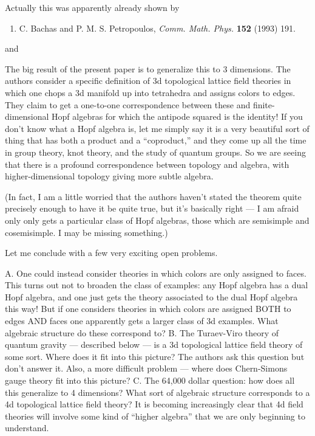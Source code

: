 \documentclass{article}
\def\tightlist{}
\renewcommand{\texttt}[1]{%
  \begingroup
  \ttfamily
  \begingroup\lccode`~=`/\lowercase{\endgroup\def~}{/\discretionary{}{}{}}%
  \begingroup\lccode`~=`[\lowercase{\endgroup\def~}{[\discretionary{}{}{}}%
  \begingroup\lccode`~=`.\lowercase{\endgroup\def~}{.\discretionary{}{}{}}%
  \catcode`/=\active\catcode`[=\active\catcode`.=\active
  \scantokens{#1\noexpand}%
  \endgroup
}
\begin{document}
Actually this was apparently already shown by

\begin{enumerate}
\def\labelenumi{\arabic{enumi})}
\setcounter{enumi}{1}
\tightlist
\item
  C. Bachas and P. M. S. Petropoulos, \emph{Comm. Math. Phys.}
  \textbf{152} (1993) 191.
\end{enumerate}

and


The big result of the present paper is to generalize this to 3
dimensions. The authors consider a specific definition of 3d topological
lattice field theories in which one chops a 3d manifold up into
tetrahedra and assigns colors to edges. They claim to get a one-to-one
correspondence between these and finite-dimensional Hopf algebras for
which the antipode squared is the identity! If you don't know what a
Hopf algebra is, let me simply say it is a very beautiful sort of thing
that has both a product and a ``coproduct,'' and they come up all the
time in group theory, knot theory, and the study of quantum groups. So
we are seeing that there is a profound correspondence between topology
and algebra, with higher-dimensional topology giving more subtle
algebra.

(In fact, I am a little worried that the authors haven't stated the
theorem quite precisely enough to have it be quite true, but it's
basically right --- I am afraid only only gets a particular class of
Hopf algebras, those which are semisimple and cosemisimple. I may be
missing something.)

Let me conclude with a few very exciting open problems.

A. One could instead consider theories in which colors are only assigned
to faces. This turns out not to broaden the class of examples: any Hopf
algebra has a dual Hopf algebra, and one just gets the theory associated
to the dual Hopf algebra this way! But if one considers theories in
which colors are assigned BOTH to edges AND faces one apparently gets a
larger class of 3d examples. What algebraic structure do these
correspond to? B. The Turaev-Viro theory of quantum gravity ---
described below --- is a 3d topological lattice field theory of some
sort. Where does it fit into this picture? The authors ask this question
but don't answer it. Also, a more difficult problem --- where does
Chern-Simons gauge theory fit into this picture? C. The 64,000 dollar
question: how does all this generalize to 4 dimensions? What sort of
algebraic structure corresponds to a 4d topological lattice field
theory? It is becoming increasingly clear that 4d field theories will
involve some kind of ``higher algebra'' that we are only beginning to
understand.
\end{document}
